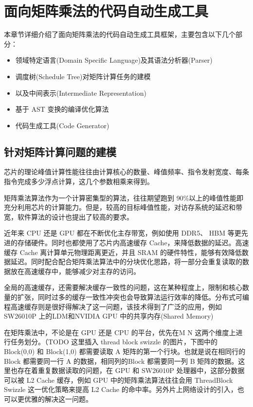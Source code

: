 \chapter{面向矩阵乘法的代码自动生成工具}\label{chap:codegen}

本章节详细介绍了面向矩阵乘法的代码自动生成工具框架，主要包含以下几个部分：

\begin{itemize}
    \item 领域特定语言(Domain Specific Language)及其语法分析器(Parser)
    \item 调度树(Schedule Tree)对矩阵计算任务的建模
    \item 以及中间表示(Intermediate Representation)
    \item 基于 AST 变换的编译优化算法
    \item 代码生成工具(Code Generator)
\end{itemize}

\section{针对矩阵计算问题的建模}

芯片的理论峰值计算性能往往由计算核心的数量、峰值频率、指令发射宽度、每条指令完成多少浮点计算，这几个参数相乘来得到。

矩阵乘法算法作为一个计算密集型的算法，往往期望跑到 90\%以上的峰值性能即充分利用芯片的计算能力。但是，较高的目标峰值性能，对访存系统的延迟和带宽，软件算法的设计也提出了较高的要求。

近年来 CPU 还是 GPU 都在不断优化主存带宽，例如使用 DDR5、 HBM 等更先进的存储硬件。同时也都使用了芯片内高速缓存 Cache，来降低数据的延迟。高速缓存 Cache 离计算单元物理距离更近，并且 SRAM 的硬件特性，能够有效降低数据延迟。同时配合配合矩阵乘法算法中的分块优化思路，将一部分会重复读取的数据放在高速缓存中，能够减少对主存的访问。

全局的高速缓存，还需要解决缓存一致性的问题，这在某种程度上，限制和核心数量的扩张，同时过多的缓存一致性冲突也会导致算法运行效率的降低。分布式可编程高速缓存则是很好得解决了这一问题，该技术得到了广泛的应用，例如 SW26010P 上的LDM和NVIDIA GPU 中的共享内存(Shared Memory)

在矩阵乘法中，不论是在 GPU 还是 CPU 的平台，优先在M N 这两个维度上进行任务划分。（TODO 这里插入 thread block swizzle 的图片，下图中的 Block(0,0) 和 Block(1,0) 都需要读取 A 矩阵的第一个行块。也就是说在相同行的 Block 都需要同一行 A 的数据，相同列的Block 都需要同一列 B 矩阵的数据。这里也存在着重复数据读取的问题，在 GPU 和 SW26010P 处理器中，这部分数据可以被 L2 Cache 缓存，例如 GPU 中的矩阵乘法算法往往会用 ThreadBlock Swizzle 这一优化策略来提高 L2 Cache 的命中率。另外片上网络设计的引入，也可以更优雅的解决这一问题。

